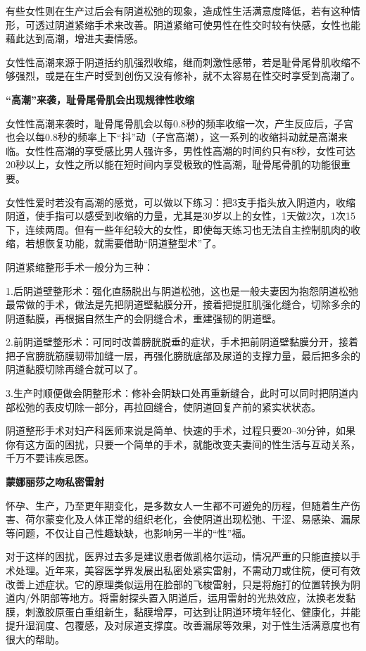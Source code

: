 \documentclass[12pt,UTF8]{ctexbook}
\begin{document}
有些女性则在生产过后会有阴道松弛的现象，造成性生活满意度降低，若有这种情形，可透过阴道紧缩手术来改善。阴道紧缩可使男性在性交时较有快感，女性也能藉此达到高潮，增进夫妻情感。

女性性高潮来源于阴道括约肌强烈收缩，继而刺激性感带，若是耻骨尾骨肌收缩不够强烈，或是在生产时受到创伤又没有修补，就不太容易在性交时享受到高潮了。

\textbf{“高潮”来袭，耻骨尾骨肌会出现规律性收缩}

女性性高潮来袭时，耻骨尾骨肌会以每0.8秒的频率收缩一次，产生反应后，子宫也会以每0.8秒的频率上下“抖”动（子宫高潮），这一系列的收缩抖动就是高潮来临。女性性高潮的享受感比男人强许多，男性性高潮的时间约只有8秒，女性可达20秒以上，女性之所以能在短时间内享受极致的性高潮，耻骨尾骨肌的功能很重要。

女性性爱时若没有高潮的感觉，可以做以下练习：把3支手指头放入阴道内，收缩阴道，使手指可以感受到收缩的力量，尤其是30岁以上的女性，1天做2次，1次15下，连续两周。但有一些年纪较大的女性，即使每天练习也无法自主控制肌肉的收缩，若想恢复功能，就需要借助“阴道整型术”了。

阴道紧缩整形手术一般分为三种：

1.后阴道壁整形术：强化直肠脱出与阴道松弛，这也是一般夫妻因为抱怨阴道松弛最常做的手术，做法是先把阴道壁黏膜分开，接着把提肛肌强化缝合，切除多余的阴道黏膜，再根据自然生产的会阴缝合术，重建强韧的阴道壁。

2.前阴道壁整形术：可同时改善膀胱脱垂的症状，手术把前阴道壁黏膜分开，接着把子宫膀胱筋膜韧带加缝一层，再强化膀胱底部及尿道的支撑力量，最后把多余的阴道黏膜切除再缝合就可以了。

3.生产时顺便做会阴整形术：修补会阴缺口处再重新缝合，此时可以同时把阴道内部松弛的表皮切除一部分，再拉回缝合，使阴道回复产前的紧实状状态。

阴道整形手术对妇产科医师来说是简单、快速的手术，过程只要20--30分钟，如果你有这方面的困扰，只要一个简单的手术，就能改变夫妻间的性生活与互动关系，千万不要讳疾忌医。

\textbf{蒙娜丽莎之吻私密雷射}

怀孕、生产，乃至更年期变化，是多数女人一生都不可避免的历程，但随着生产伤害、荷尔蒙变化及人体正常的组织老化，会使阴道出现松弛、干涩、易感染、漏尿等问题，不仅让自己性趣缺缺，也影响另一半的“性”福。

对于这样的困扰，医界过去多是建议患者做凯格尔运动，情况严重的只能直接以手术处理。近年来，美容医学界发展出私密处紧实雷射，不需动刀或住院，便可有效改善上述症状。它的原理类似运用在脸部的飞梭雷射，只是将施打的位置转换为阴道内/外阴部等地方。将雷射探头置入阴道后，运用雷射的光热效应，汰换老发黏膜，刺激胶原蛋白重组新生，黏膜增厚，可达到让阴道环境年轻化、健康化，并能提升湿润度、包覆感，及对尿道支撑度。改善漏尿等效果，对于性生活满意度也有很大的帮助。
\end{document}
